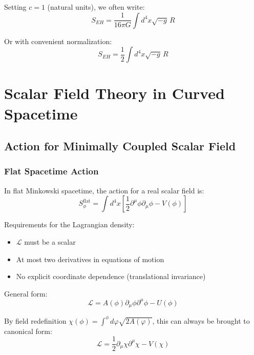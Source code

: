 \documentclass[11pt,a4paper]{article}
\begin{document}
Setting $c = 1$ (natural units), we often write:
\begin{equation}
S_{EH} = \frac{1}{16\pi G} \int d^4x \sqrt{-g} \, R
\end{equation}

Or with convenient normalization:
\begin{equation}
S_{EH} = \frac{1}{2} \int d^4x \sqrt{-g} \, R
\end{equation}

\section{Scalar Field Theory in Curved Spacetime}

\subsection{Action for Minimally Coupled Scalar Field}

\subsubsection{Flat Spacetime Action}

In flat Minkowski spacetime, the action for a real scalar field is:
\begin{equation}
S_\phi^{\text{flat}} = \int d^4x \left[ \frac{1}{2} \partial^\mu \phi \partial_\mu \phi - V(\phi) \right]
\end{equation}

Requirements for the Lagrangian density:
\begin{itemize}
\item $\mathcal{L}$ must be a scalar
\item At most two derivatives in equations of motion
\item No explicit coordinate dependence (translational invariance)
\end{itemize}

General form:
\begin{equation}
\mathcal{L} = A(\phi)\partial_\mu \phi \partial^\mu \phi - U(\phi)
\end{equation}

By field redefinition $\chi(\phi) = \int^\phi d\varphi \sqrt{2A(\varphi)}$, this can always be brought to canonical form:
\begin{equation}
\mathcal{L} = \frac{1}{2} \partial_\mu \chi \partial^\mu \chi - V(\chi)
\end{equation}
\end{document}
